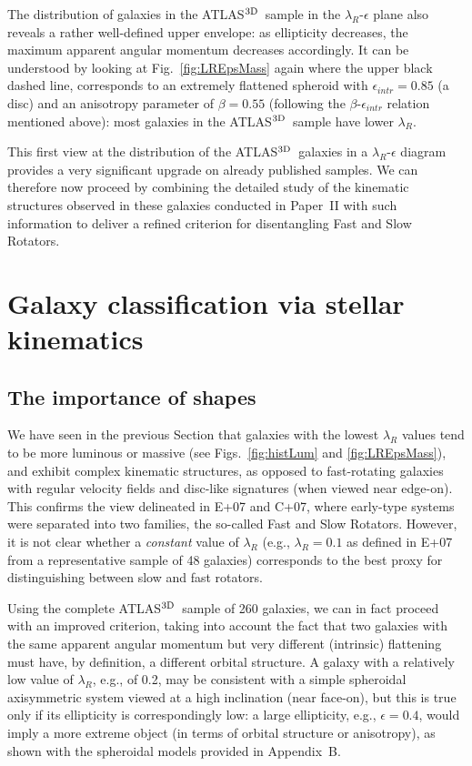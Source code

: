 \documentclass[useAMS,usenatbib,usegraphicx]{mn2e}
\newcommand{\atlas}{{ATLAS$^{\rm 3D}$}}
\begin{document}
The distribution of galaxies in the \atlas\ sample in the $\lambda_R$-$\epsilon$
plane also reveals a rather well-defined upper envelope: as ellipticity decreases,
the maximum apparent angular momentum decreases accordingly. It can 
be understood by looking at Fig.~\ref{fig:LREpsMass} again where the upper black dashed line,
corresponds to an extremely flattened spheroid with $\epsilon_{intr} = 0.85$ (a disc) and an anisotropy
parameter of $\beta = 0.55$ (following the $\beta$-$\epsilon_{intr}$ relation
mentioned above): most galaxies in the \atlas\ sample have lower $\lambda_R$.

This first view at the distribution of the \atlas\ galaxies in
a $\lambda_R$-$\epsilon$ diagram provides a very significant upgrade on
already published samples. We can therefore now proceed by combining the
detailed study of the kinematic structures observed in these galaxies conducted
in Paper~II with such information to deliver a refined criterion for
disentangling Fast and Slow Rotators.

\section{Galaxy classification via stellar kinematics}
\label{sec:slowfast}

\subsection{The importance of shapes}
\label{sec:twofamilies}
We have seen in the previous Section that galaxies with the lowest $\lambda_R$ values 
tend to be more luminous or massive (see Figs.~\ref{fig:histLum} and \ref{fig:LREpsMass}), and
exhibit complex kinematic structures, as opposed to fast-rotating galaxies
with regular velocity fields and disc-like signatures (when viewed near edge-on). 
This confirms the view delineated in E+07 and C+07,
where early-type systems were separated into two families, the
so-called Fast and Slow Rotators. However, it is not clear whether 
a {\em constant} value of $\lambda_R$ (e.g., $\lambda_R = 0.1$ 
as defined in E+07 from a representative sample of 48 galaxies) corresponds
to the best proxy for distinguishing between slow and fast rotators. 

Using the complete \atlas\ sample of 260 galaxies, we can in fact proceed with an improved
criterion, taking into account the fact that two galaxies with the
same apparent angular momentum but very different (intrinsic) flattening must have, by
definition, a different orbital structure. A galaxy with a relatively low value of $\lambda_R$,
e.g., of 0.2, may be consistent with a simple spheroidal axisymmetric system viewed at a
high inclination (near face-on), but this is true only if its ellipticity is 
correspondingly low: a large ellipticity, e.g., $\epsilon=0.4$, would 
imply a more extreme object (in terms of orbital structure or anisotropy), as
shown with the spheroidal models provided in Appendix~B.
\end{document}
